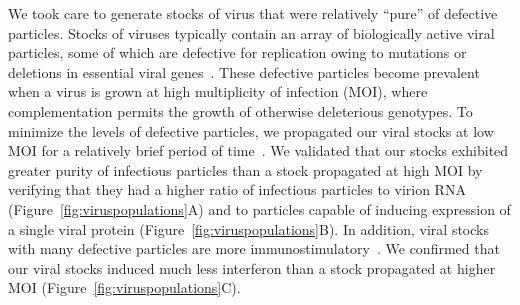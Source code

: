 \documentclass[9pt,lineno]{elife}
\begin{document}
We took care to generate stocks of virus that were relatively ``pure'' of defective particles.
Stocks of viruses typically contain an array of biologically active viral particles, some of which are defective for replication owing to mutations or deletions in essential viral genes~\citep{von1954incomplete,huang1970defective,Brooke:2014ch,Fonville:2015cg,Lauring:2010if,Dimmock:2014dk}.
These defective particles become prevalent when a virus is grown at high multiplicity of infection (MOI), where complementation permits the growth of otherwise deleterious genotypes.
To minimize the levels of defective particles, we propagated our viral stocks at low MOI for a relatively brief period of time~\citep{Xue:2016bw}.
We validated that our stocks exhibited greater purity of infectious particles than a stock propagated at high MOI by verifying that they had a higher ratio of infectious particles to virion RNA (Figure~\ref{fig:viruspopulations}A) and to particles capable of inducing expression of a single viral protein (Figure~\ref{fig:viruspopulations}B).
In addition, viral stocks with many defective particles are more immunostimulatory~\citep{Tapia:2013kf,Lopez:2014en}.
We confirmed that our viral stocks induced much less interferon than a stock propagated at higher MOI (Figure~\ref{fig:viruspopulations}C).
\end{document}

